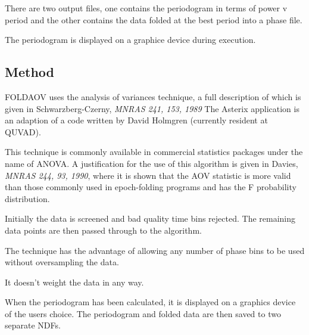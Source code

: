 \documentclass{book}
\renewcommand{\_}{{\tt\char'137}}     %
\begin{document}
There are two output files, one contains the periodogram in terms
of power v period and the other contains the data folded at the
best period into a phase file.
 
The periodogram is displayed on a graphice device during execution.
 
\subsection{Method}
FOLDAOV uses the analysis of variances technique, a full description
of which is given in Schwarzberg-Czerny, {\em MNRAS 241, 153, 1989}
The Asterix application is an adaption of a code written by David
Holmgren (currently resident at QUVAD).
 
This technique is commonly available in commercial statistics
packages under the name of ANOVA. A justification for the use
of this algorithm is given in Davies, {\em MNRAS 244, 93, 1990}, where
it is shown that the AOV statistic is more valid than those
commonly used in epoch-folding programs and has the F probability
distribution.
 
Initially the data is screened and bad quality time bins rejected.
The remaining data points are then passed through to the algorithm.
 
The technique has the advantage of allowing any number of phase
bins to be used without oversampling the data.
 
It doesn't weight the data in any way.
 
When the periodogram has been calculated, it is displayed on a
graphics device of the users choice. The periodogram and folded
data are then saved to two separate NDFs.
 
\end{document}
